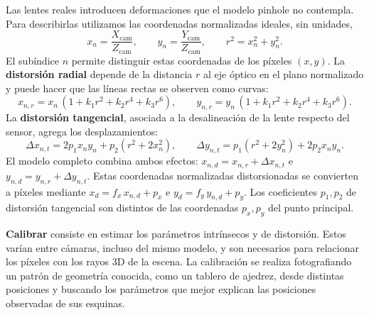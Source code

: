 \documentclass[a4paper,11pt]{article}
\begin{document}
Las lentes reales introducen deformaciones que el modelo pinhole no contempla. Para describirlas utilizamos las coordenadas normalizadas ideales, sin unidades,
\begin{equation}
x_n = \frac{X_{\mathrm{cam}}}{Z_{\mathrm{cam}}}, \qquad
y_n = \frac{Y_{\mathrm{cam}}}{Z_{\mathrm{cam}}}, \qquad
r^2 = x_n^2+y_n^2.
\end{equation}
El subíndice $n$ permite distinguir estas coordenadas de los píxeles $(x,y)$. La \textbf{distorsión radial} depende de la distancia $r$ al eje óptico en el plano normalizado y puede hacer que las líneas rectas se observen como curvas:
\begin{equation}
x_{n,r} = x_n\,(1+k_1r^2+k_2r^4+k_3r^6), \qquad
y_{n,r} = y_n\,(1+k_1r^2+k_2r^4+k_3r^6).
\end{equation}
La \textbf{distorsión tangencial}, asociada a la desalineación de la lente respecto del sensor, agrega los desplazamientos:
\begin{equation}
\Delta x_{n,t} = 2p_1x_ny_n+p_2(r^2+2x_n^2), \qquad
\Delta y_{n,t} = p_1(r^2+2y_n^2)+2p_2x_ny_n.
\end{equation}
El modelo completo combina ambos efectos: $x_{n,d}=x_{n,r}+\Delta x_{n,t}$ e $y_{n,d}=y_{n,r}+\Delta y_{n,t}$. Estas coordenadas normalizadas distorsionadas se convierten a píxeles mediante $x_d=f_x\,x_{n,d}+p_x$ e $y_d=f_y\,y_{n,d}+p_y$. Los coeficientes $p_1,p_2$ de distorsión tangencial son distintos de las coordenadas $p_x,p_y$ del punto principal.

\textbf{Calibrar} consiste en estimar los parámetros intrínsecos y de distorsión. Estos varían entre cámaras, incluso del mismo modelo, y son necesarios para relacionar los píxeles con los rayos 3D de la escena. La calibración se realiza fotografiando un patrón de geometría conocida, como un tablero de ajedrez, desde distintas posiciones y buscando los parámetros que mejor explican las posiciones observadas de sus esquinas.
\end{document}
